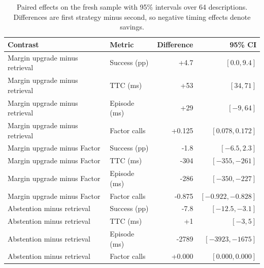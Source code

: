 \documentclass[sigconf,nonacm,balance=false]{aamas}
\newcommand{\tabstyle}{\small\setlength{\tabcolsep}{3pt}\renewcommand{\arraystretch}{1.10}}
\begin{document}
\begin{table}[!htbp]
\centering\tabstyle
\caption{Paired effects on the fresh sample with 95\% intervals over 64 descriptions. Differences are first strategy minus second, so negative timing effects denote savings.}
\label{tab:selection-timing-effects}
\begin{tabular}{@{}llrr@{}}
\toprule
\textbf{Contrast} & \textbf{Metric} & \textbf{Difference} & \textbf{95\% CI}\\
\midrule
Margin upgrade minus retrieval & Success (pp) & +4.7 & $[0.0,9.4]$\\
Margin upgrade minus retrieval & TTC (ms) & +53 & $[34,71]$\\
Margin upgrade minus retrieval & Episode (ms) & +29 & $[-9,64]$\\
Margin upgrade minus retrieval & Factor calls & +0.125 & $[0.078,0.172]$\\
Margin upgrade minus Factor & Success (pp) & -1.8 & $[-6.5,2.3]$\\
Margin upgrade minus Factor & TTC (ms) & -304 & $[-355,-261]$\\
Margin upgrade minus Factor & Episode (ms) & -286 & $[-350,-227]$\\
Margin upgrade minus Factor & Factor calls & -0.875 & $[-0.922,-0.828]$\\
Abstention minus retrieval & Success (pp) & -7.8 & $[-12.5,-3.1]$\\
Abstention minus retrieval & TTC (ms) & +1 & $[-3,5]$\\
Abstention minus retrieval & Episode (ms) & -2789 & $[-3923,-1675]$\\
Abstention minus retrieval & Factor calls & +0.000 & $[0.000,0.000]$\\
\bottomrule
\end{tabular}
\end{table}
\end{document}
